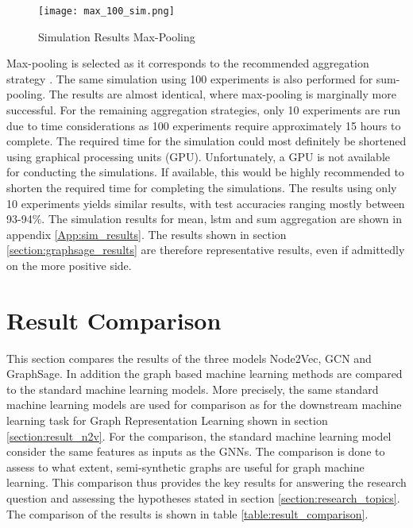   \begin{figure}[htbp!]
		\centering
		\texttt{[image: max\_100\_sim.png]}
		\caption{Simulation Results Max-Pooling}
        \label{fig:simulation_results}
  \end{figure}

  \noindent Max-pooling is selected as it corresponds to the recommended
  aggregation strategy \citep[p. 9]{hamilton2017inductive}. The same simulation
  using 100 experiments is also performed for sum-pooling. The results are
  almost identical, where max-pooling is marginally more successful. For the 
  remaining aggregation strategies, only 10 experiments are run due to time
  considerations as 100 experiments require approximately 15 hours to complete.
  The required time for the simulation could most definitely be shortened using
  graphical processing units (GPU). Unfortunately, a GPU is not available for
  conducting the simulations. If available, this would be highly recommended to
  shorten the required time for completing the simulations. The results using 
  only 10 experiments yields similar results, with test accuracies ranging 
  mostly between 93-94\%. The simulation results for mean, lstm and sum 
  aggregation are shown in appendix \ref{App:sim_results}. The results shown in 
  section \ref{section:graphsage_results} are therefore representative results, 
  even if admittedly on the more positive side. 

  \newpage
  \section{Result Comparison}
  \label{section:result_comp}

  This section compares the results of the three models Node2Vec, GCN and
  GraphSage. In addition the graph based machine learning methods are compared
  to the standard machine learning models. More precisely, the same standard
  machine learning models are used for comparison as for the downstream 
  machine learning task for Graph Representation Learning shown in section 
  \ref{section:result_n2v}. For the comparison, the standard machine learning 
  model consider the same features as inputs as the GNNs. The comparison is 
  done to assess to what extent, semi-synthetic graphs are useful for graph 
  machine learning. This comparison thus provides the key results for answering
  the research question and assessing the hypotheses stated in section 
  \ref{section:research_topics}. The comparison of the results is shown in table 
  \ref{table:result_comparison}.

